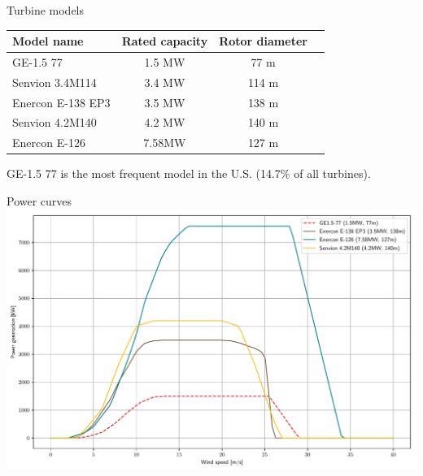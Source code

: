 \documentclass[color=usenames,dvipsnames]{beamer}
\begin{document}
    \begin{frame}{Turbine models}
        \begin{center}
            \begin{tabular}{| l | c | c | l }
                \hline
                \bfseries{Model name} & \bfseries{Rated capacity} & \bfseries{Rotor diameter}\\
                \hline
                GE-1.5 77 & 1.5 MW & 77 m\\
                \hline
                Senvion 3.4M114 & 3.4 MW & 114 m\\
                \hline
                Enercon E-138 EP3 & 3.5 MW & 138 m\\
                \hline
                Senvion 4.2M140 & 4.2 MW & 140 m\\
                \hline
                Enercon E-126 & 7.58MW & 127 m\\
                \hline
            \end{tabular}
        \end{center}

        \bigskip

        GE-1.5 77 is the most frequent model in the U.S. (14.7\% of all turbines).

    \end{frame}

    \begin{frame}{Power curves}
        \includegraphics[width=\textwidth]{../../figures/power_curves.pdf}
    \end{frame}
\end{document}
